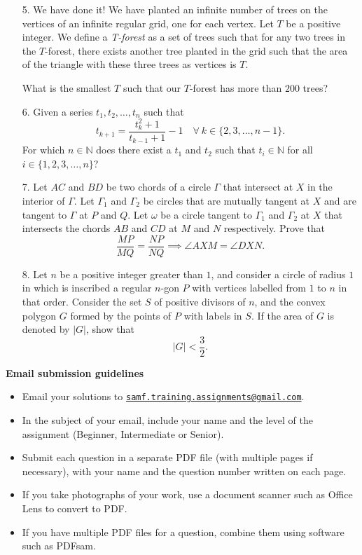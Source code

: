 \documentclass{article}
\begin{document}
\begin{enumerate}
\medskip
\item[5.] %
We have done it! We have planted an infinite number of trees on the vertices of an infinite regular grid, one for each vertex. Let $T$ be a positive integer. 
We define a \textit{T-forest} as a set of trees such that for any two trees in the $T$-forest, there exists another tree planted in the grid such that the area of the triangle with these three trees as vertices is $T$.

What is the smallest $T$ such that our $T$-forest has more than $200$ trees?


\medskip
\item[6.] %
Given a series $t_1, t_2, \dotsc, t_n$ such that 
\[ t_{k + 1} = \frac{t_k^2 + 1}{t_{k-1} + 1} - 1 \quad \forall \ k \in \{2, 3, \dots, n-1\}. \]
For which $n \in \mathbb{N}$ does there exist a $t_1$ and $t_2$ such that $t_i \in \mathbb{N}$ for all $i \in \{1, 2, 3, \dotsc, n\}$?


\medskip
\item[7.]
Let $AC$ and $BD$ be two chords of a circle $\Gamma$ that intersect at $X$ in the interior of $\Gamma$.
Let $\Gamma_1$ and $\Gamma_2$ be circles that are mutually tangent at $X$ and are tangent to $\Gamma$ at $P$ and $Q$.
Let $\omega$ be a circle tangent to $\Gamma_1$ and $\Gamma_2$ at $X$ that intersects the chords $AB$ and $CD$ at $M$ and $N$ respectively.
Prove that
\[
	\frac{MP}{MQ} = \frac{NP}{NQ} \implies \angle AXM = \angle DXN.
\]


\medskip
\item[8.] %
Let $n$ be a positive integer greater than $1$, and consider a circle of radius $1$ in which is inscribed a regular $n$-gon $P$ with vertices labelled from $1$ to $n$ in that order.
Consider the set $S$ of positive divisors of $n$, and the convex polygon $G$ formed by the points of $P$ with labels in $S$.
If the area of $G$ is denoted by $|G|$, show that
\[ 
	|G| < \frac{3}{2}.
\]

\end{enumerate}

\vfill
\textbf{\Large Email submission guidelines}
\begin{itemize}
	\item Email your solutions to \href{mailto:samf.training.assignments@gmail.com}{\texttt{samf.training.assignments@gmail.com}}.
	\item In the subject of your email, include your name and the level of the assignment (Beginner, Intermediate or Senior).
	\item Submit each question in a separate PDF file (with multiple pages if necessary), with your name and the question number written on each page.
	\item If you take photographs of your work, use a document scanner such as Office Lens to convert to PDF.
	\item If you have multiple PDF files for a question, combine them using software such as PDFsam.
\end{itemize}
\end{document}
